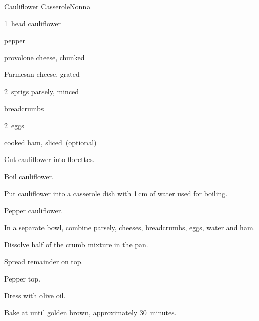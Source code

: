 \begin{recipe}{Cauliflower Casserole}{Nonna}{}

\begin{ingredients}
\item 1~head cauliflower
\item pepper
\item \C{\half} provolone cheese, chunked
\item \C{\half} Parmesan cheese, grated
\item 2~sprigs parsely, minced
\item \C{\threequarter} breadcrumbs
\item 2~eggs
\item \C{\quarter} cooked ham, sliced~(optional)
\end{ingredients}

\begin{directions}
\item Cut cauliflower into florettes.
\item Boil cauliflower.
\item Put cauliflower into a casserole dish with 1\,cm of water used for boiling.
\item Pepper cauliflower.
\item In a separate bowl, combine parsely, cheeses, breadcrumbs, eggs, \C{\quarter} water and ham.
\item Dissolve half of the crumb mixture in the pan.
\item Spread remainder on top.
\item Pepper top.
\item Dress with olive oil.
\item Bake at  until golden brown, approximately 30~minutes.
\end{directions}

\end{recipe}
